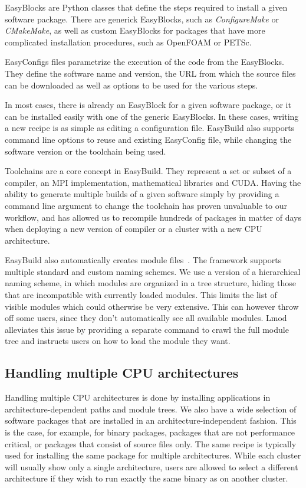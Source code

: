 \documentclass[sigconf]{acmart}
\begin{document}
EasyBlocks are Python classes that define the steps required to install a given software package. There are generick EasyBlocks, such as {\it ConfigureMake} or {\it CMakeMake}, as well as custom EasyBlocks for packages that have more complicated installation procedures, such as OpenFOAM or PETSc. 

EasyConfigs files parametrize the execution of the code from the EasyBlocks. They define the software name and version, the URL from which the source files can be downloaded as well as options to be used for the various steps. 

In most cases, there is already an EasyBlock for a given software package, or it can be installed easily with one of the generic EasyBlocks. In these cases, writing a new recipe is as simple as editing a configuration file. EasyBuild also supports command line options to reuse and existing EasyConfig file, while changing the software version or the toolchain being used. 

Toolchains are a core concept in EasyBuild. They represent a set or subset of a compiler, an MPI implementation, mathematical libraries and CUDA. Having the ability to generate multiple builds of a given software simply by providing a command line argument to change the toolchain has proven unvaluable to our workflow, and has allowed us to recompile hundreds of packages in matter of days when deploying a new version of compiler or a cluster with a new CPU architecture. 

EasyBuild also automatically creates module files~\cite{Modules1991,Modules1996,Lmod}. The framework supports multiple standard and custom naming schemes. We use a version of a hierarchical naming scheme, in which modules are organized in a tree structure, hiding those that are incompatible with currently loaded modules. This limits the list of visible modules which could otherwise be very extensive. This can however throw off some users, since they don’t automatically see all available modules. Lmod~\cite{Lmod} alleviates this issue by providing a separate command to crawl the full module tree and instructs users on how to load the module they want.

\subsection{Handling multiple CPU architectures}
\label{sub:Handling_multiple_CPU_architectures}
Handling multiple CPU architectures is done by installing applications in architecture-dependent paths and module trees. We also have a wide selection of software packages that are installed in an architecture-independent fashion. This is the case, for example, for binary packages, packages that are not performance critical, or packages that consist of source files only. The same recipe is typically used for installing the same package for multiple architectures. While each cluster will usually show only a single architecture, users are allowed to select a different architecture if they wish to run exactly the same binary as on another cluster.
\end{document}

